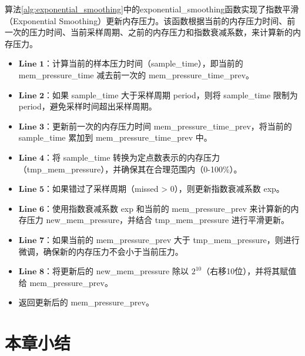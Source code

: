 算法\ref{alg:exponential_smoothing}中的exponential\_smoothing函数实现了指数平滑（Exponential Smoothing）更新内存压力。该函数根据当前的内存压力时间、前一次的压力时间、当前采样周期、之前的内存压力和指数衰减系数，来计算新的内存压力。

\begin{itemize}
    \item \(\textbf{Line 1}\)：计算当前的样本压力时间（sample\_time），即当前的 \\mem\_pressure\_time 减去前一次的 mem\_pressure\_time\_prev。
    \item \(\textbf{Line 2}\)：如果 sample\_time 大于采样周期 period，则将 sample\_time 限制为 period，避免采样时间超出采样周期。
    \item \(\textbf{Line 3}\)：更新前一次的内存压力时间 mem\_pressure\_time\_prev，将当前的 sample\_time 累加到 mem\_pressure\_time\_prev 中。
    \item \(\textbf{Line 4}\)：将 sample\_time 转换为定点数表示的内存压力（tmp\_mem\_pressure），并确保其在合理范围内（0-100\%）。
    \item \(\textbf{Line 5}\)：如果错过了采样周期（missed > 0），则更新指数衰减系数 exp。
    \item \(\textbf{Line 6}\)：使用指数衰减系数 exp 和当前的 mem\_pressure\_prev 来计算新的内存压力 new\_mem\_pressure，并结合 tmp\_mem\_pressure 进行平滑更新。
    \item \(\textbf{Line 7}\)：如果当前的 mem\_pressure\_prev 大于 tmp\_mem\_pressure，则进行微调，确保新的内存压力不会小于当前压力。
    \item \(\textbf{Line 8}\)：将更新后的 new\_mem\_pressure 除以 \(2^{10}\)（右移10位），并将其赋值给 mem\_pressure\_prev。
    \item 返回更新后的 mem\_pressure\_prev。
\end{itemize}
\section{本章小结}